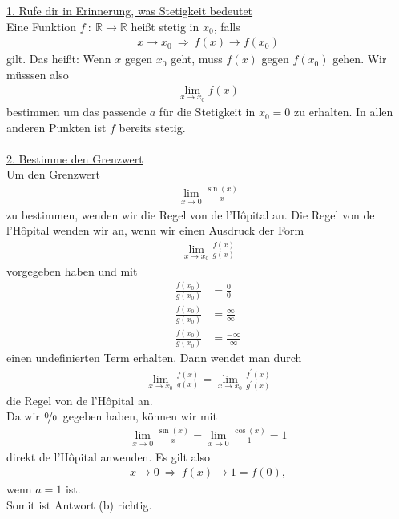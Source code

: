 \underline{1. Rufe dir in Erinnerung, was Stetigkeit bedeutet}\\
Eine Funktion $f \ : \ \mathbb{R} \to \mathbb{R}$ heißt stetig in $x_0$,
falls 
\begin{align*}
x \rightarrow x_0 \ \Rightarrow \ f(x) \rightarrow f(x_0)
\end{align*}
gilt.
Das heißt: Wenn $x$ gegen $x_0$ geht, muss $f(x)$ gegen $f(x_0)$ gehen.
Wir müsssen also 
\begin{align*}
\lim \limits_{x \rightarrow x_0} f(x)
\end{align*}
bestimmen um das passende $a$ für die Stetigkeit in $x_0 = 0$ zu erhalten.
In allen anderen Punkten ist $f$ bereits stetig.\\
\\
\underline{2. Bestimme den Grenzwert}\\
Um den Grenzwert 
\begin{align*}
\lim \limits_{x \rightarrow 0} \frac{\sin(x)}{x}
\end{align*}
zu bestimmen, wenden wir die Regel von de l'H\^{o}pital an.
Die Regel von de l'H\^{o}pital wenden wir an, wenn wir einen Ausdruck der Form 
\begin{align*}
\lim \limits_{x \to x_0} \frac{f(x)}{g(x)}
\end{align*}
vorgegeben haben und mit
\begin{align*}
\frac{f(x_0)}{g(x_0)} &= \frac{0}{0} \\
\frac{f(x_0)}{g(x_0)} &= \frac{\infty}{\infty}\\
\frac{f(x_0)}{g(x_0)} &= \frac{-\infty}{\infty}
\end{align*}
einen undefinierten Term erhalten.
Dann wendet man durch
\begin{align*}
\lim \limits_{x \to x_0} \frac{f(x)}{g(x)}
=
\lim \limits_{x \to x_0} \frac{f^\prime(x)}{g^\prime(x)}
\end{align*}
die Regel von de l'H\^{o}pital an.\\
Da wir \glqq $\nicefrac{0}{0}$\grqq~gegeben haben, können wir mit
\begin{align*}
\lim \limits_{x \rightarrow 0} \frac{\sin(x)}{x}
= \lim \limits_{x \rightarrow 0} \frac{\cos(x)}{1} = 1
\end{align*}
direkt de l'H\^{o}pital anwenden. Es gilt also 
\begin{align*}
x \rightarrow 0 \ \Rightarrow \ f(x) \rightarrow  1 = f(0), 
\end{align*}
wenn $a = 1 $ ist.\\
Somit ist Antwort (b) richtig.

